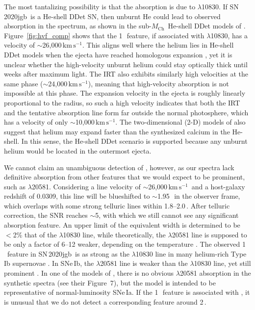 \documentclass[twocolumn]{aastex631}
\newcommand{\sn}{SN\,2020jgb}
\newcommand{\Mch}{$M_\mathrm{Ch}$}
\newcommand{\kms}{$\mathrm{km}\,\mathrm{s}^{-1}$}
\begin{document}
\begin{CJK*}{UTF8}{gbsn}
The most tantalizing possibility is that the absorption is due to  $\lambda$10830. If \sn\ is a He-shell DDet SN, then unburnt He could lead to observed absorption in the spectrum, as shown in the sub-\Mch\ He-shell DDet models of \citet{Boyle2017_Helium}. Figure~\ref{fig:hvf_comp} shows that the 1\,\micron\ feature, if associated with  $\lambda$10830, has a velocity of $\sim$26,000\,\kms. This aligns well where the helium lies in He-shell DDet models when the ejecta have reached homologous expansion \citep{Kromer_DD_2010, polin_observational_2019}, yet it is unclear whether the high-velocity unburnt helium could stay optically thick until weeks after maximum light. The  IRT also exhibits similarly high velocities at the same phase ($\sim$24,000\,\kms), meaning that high-velocity absorption is not impossible at this phase. The expansion velocity in the ejecta is roughly linearly proportional to the radius, so such a high velocity indicates that both the  IRT and the tentative  absorption line form far outside the normal photosphere, which has a velocity of only $\sim$10,000\,\kms. The two-dimensional (2-D) models of \citet{Kromer_DD_2010} also suggest that helium may expand faster than the synthesized calcium in the He-shell. In this sense, the He-shell DDet scenario is supported because any unburnt helium would be located in the outermost ejecta.

We cannot claim an unambiguous detection of , however, as our spectra lack definitive absorption from other  features that we would expect to be prominent, such as  $\lambda$20581. Considering a line velocity of $\sim$26,000\,\kms\ and a host-galaxy redshift of 0.0309, this line will be blueshifted to $\sim$1.95\,\micron\ in the observer frame, which overlaps with some strong telluric lines within 1.8--2.0\,\micron. After telluric correction, the SNR reaches $\sim$5, with which we still cannot see any significant absorption feature. An upper limit of the equivalent width is determined to be $<$2\% that of the  $\lambda$10830 line, while theoretically, the $\lambda$20581 line is supposed to be only a factor of 6--12 weaker, depending on the temperature \citep{Marion2009_NIR}. The observed 1\,\micron\ feature in \sn\ is as strong as the  $\lambda$10830 line in many helium-rich Type Ib supernovae \citep[SNe\,Ib; see][for a review of SN spectral classification]{Filippenko97}. In SNe\,Ib, the  $\lambda$20581 line is weaker than the  $\lambda$10830 line, yet still prominent \citep{CSP_Ibc_2022}. In one of the models of \citet{Boyle2017_Helium}, there is no obvious  $\lambda$20581 absorption in the synthetic spectra (see their Figure~7), but the model is intended to be representative of normal-luminosity SNe\,Ia. If the 1\,\micron\ feature is associated with , it is unusual that we do not detect a corresponding feature around 2\,\micron.


\end{CJK*}
\end{document}
